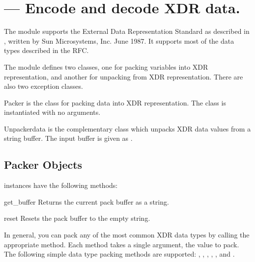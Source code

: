 \section{ ---
         Encode and decode XDR data.}




The  module supports the External Data Representation
Standard as described in , written by Sun Microsystems,
Inc. June 1987.  It supports most of the data types described in the
RFC.

The  module defines two classes, one for packing
variables into XDR representation, and another for unpacking from XDR
representation.  There are also two exception classes.

\begin{classdesc}{Packer}{}
 is the class for packing data into XDR representation.
The  class is instantiated with no arguments.
\end{classdesc}

\begin{classdesc}{Unpacker}{data}
 is the complementary class which unpacks XDR data
values from a string buffer.  The input buffer is given as
.
\end{classdesc}


\subsection{Packer Objects \label{xdr-packer-objects}}

 instances have the following methods:

\begin{methoddesc}[Packer]{get_buffer}{}
Returns the current pack buffer as a string.
\end{methoddesc}

\begin{methoddesc}[Packer]{reset}{}
Resets the pack buffer to the empty string.
\end{methoddesc}

In general, you can pack any of the most common XDR data types by
calling the appropriate  method.  Each method
takes a single argument, the value to pack.  The following simple data
type packing methods are supported: ,
, , ,
, and .

